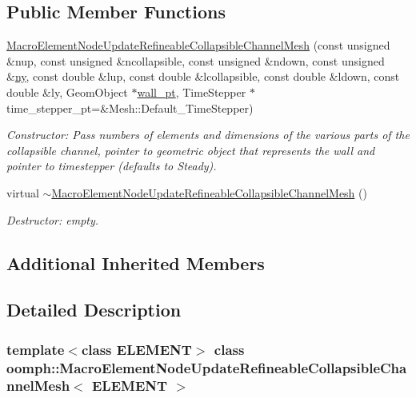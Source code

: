 \subsection*{Public Member Functions}
\begin{DoxyCompactItemize}
\item 
\hyperlink{classoomph_1_1MacroElementNodeUpdateRefineableCollapsibleChannelMesh_a6e3dfbb3d4dee7897d59aa10cde2dab1}{Macro\+Element\+Node\+Update\+Refineable\+Collapsible\+Channel\+Mesh} (const unsigned \&nup, const unsigned \&ncollapsible, const unsigned \&ndown, const unsigned \&\hyperlink{classoomph_1_1SimpleRectangularQuadMesh_a45011f22dedd480392b1f376e4269921}{ny}, const double \&lup, const double \&lcollapsible, const double \&ldown, const double \&ly, Geom\+Object $\ast$\hyperlink{classoomph_1_1CollapsibleChannelMesh_a04ffeb61678763dfd250962ea9ba614b}{wall\+\_\+pt}, Time\+Stepper $\ast$time\+\_\+stepper\+\_\+pt=\&Mesh\+::\+Default\+\_\+\+Time\+Stepper)
\begin{DoxyCompactList}\small\item\em Constructor\+: Pass numbers of elements and dimensions of the various parts of the collapsible channel, pointer to geometric object that represents the wall and pointer to timestepper (defaults to Steady). \end{DoxyCompactList}\item 
virtual \hyperlink{classoomph_1_1MacroElementNodeUpdateRefineableCollapsibleChannelMesh_a5f0960e124d26e10cc70e2143744a07f}{$\sim$\+Macro\+Element\+Node\+Update\+Refineable\+Collapsible\+Channel\+Mesh} ()
\begin{DoxyCompactList}\small\item\em Destructor\+: empty. \end{DoxyCompactList}\end{DoxyCompactItemize}
\subsection*{Additional Inherited Members}


\subsection{Detailed Description}
\subsubsection*{template$<$class E\+L\+E\+M\+E\+NT$>$\newline
class oomph\+::\+Macro\+Element\+Node\+Update\+Refineable\+Collapsible\+Channel\+Mesh$<$ E\+L\+E\+M\+E\+N\+T $>$}

